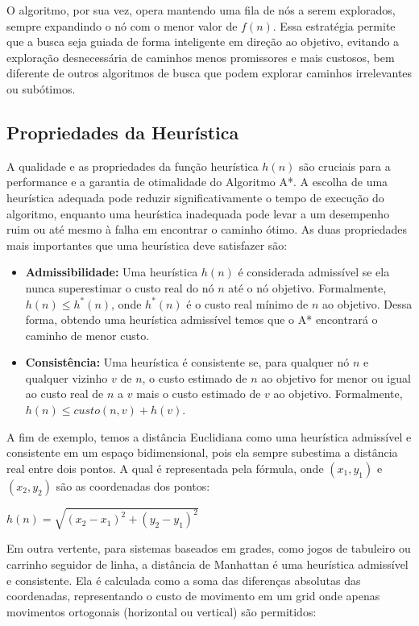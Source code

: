 \documentclass[conference]{IEEEtran}
\begin{document}
O algoritmo, por sua vez, opera mantendo uma fila de nós a serem explorados, sempre expandindo o nó com o menor valor de $f(n)$. Essa estratégia permite que a busca seja guiada de forma inteligente em direção ao objetivo, evitando a exploração desnecessária de caminhos menos promissores e mais custosos, bem diferente de outros algoritmos de busca que podem explorar caminhos irrelevantes ou subótimos.

\subsection{Propriedades da Heurística}
A qualidade e as propriedades da função heurística $h(n)$ são cruciais para a performance e a garantia de otimalidade do Algoritmo A*.
A escolha de uma heurística adequada pode reduzir significativamente o tempo de execução do algoritmo, enquanto uma heurística inadequada pode levar a um desempenho ruim ou até mesmo à falha em encontrar o caminho ótimo. As duas propriedades mais importantes que uma heurística deve satisfazer são:

\begin{itemize}
    \item \textbf{Admissibilidade:} Uma heurística $h(n)$ é considerada admissível se ela nunca superestimar o custo real do nó $n$ até o nó objetivo. Formalmente, $h(n) \le h^*(n)$, onde $h^*(n)$ é o custo real mínimo de $n$ ao objetivo. Dessa forma, obtendo uma heurística admissível temos que o A* encontrará o caminho de menor custo.
    \item \textbf{Consistência:} Uma heurística é consistente se, para qualquer nó $n$ e qualquer vizinho $v$ de $n$, o custo estimado de $n$ ao objetivo for menor ou igual ao custo real de $n$ a $v$ mais o custo estimado de $v$ ao objetivo. Formalmente, $h(n) \le {custo}(n, v) + h(v)$. 
\end{itemize}

A fim de exemplo, temos a distância Euclidiana como uma heurística admissível e consistente em um espaço bidimensional, pois ela sempre subestima a distância real entre dois pontos. A qual é representada pela fórmula, onde $(x_1, y_1)$ e $(x_2, y_2)$ são as coordenadas dos pontos:

\begin{center}
  $h(n) = \sqrt{(x_2 - x_1)^2 + (y_2 - y_1)^2}$
\end{center}

Em outra vertente, para sistemas baseados em grades, como jogos de tabuleiro ou carrinho seguidor de linha, a distância de Manhattan é uma heurística admissível e consistente. Ela é calculada como a soma das diferenças absolutas das coordenadas, representando o custo de movimento em um grid onde apenas movimentos ortogonais (horizontal ou vertical) são permitidos:
\end{document}
